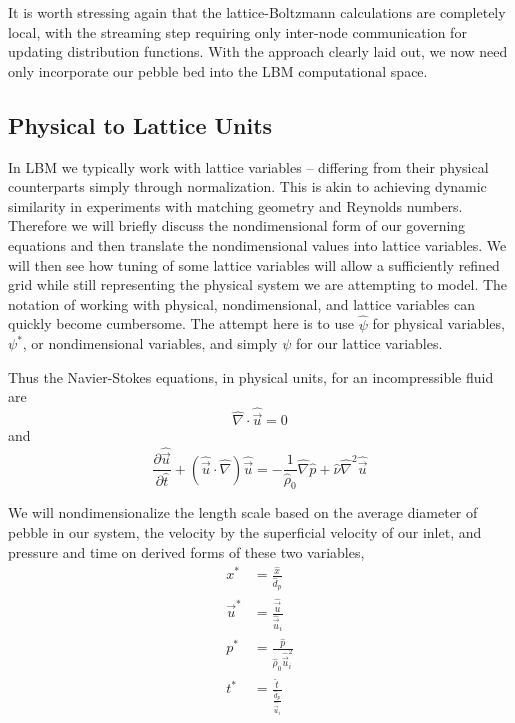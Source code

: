 It is worth stressing again that the lattice-Boltzmann calculations are completely local, with the streaming step requiring only inter-node communication for updating distribution functions. With the approach clearly laid out, we now need only incorporate our pebble bed into the LBM computational space.





\subsection{Physical to Lattice Units}\label{sec:physical-to-lattice}
In LBM we typically work with lattice variables -- differing from their physical counterparts simply through normalization. This is akin to achieving dynamic similarity in experiments with matching geometry and Reynolds numbers. Therefore we will briefly discuss the nondimensional form of our governing equations and then translate the nondimensional values into lattice variables. We will then see how tuning of some lattice variables will allow a sufficiently refined grid while still representing the physical system we are attempting to model. The notation of working with physical, nondimensional, and lattice variables can quickly become cumbersome. The attempt here is to use $\hat{\psi}$ for physical variables, $\psi^*$, or nondimensional variables, and simply $\psi$ for our lattice variables.

Thus the Navier-Stokes equations, in physical units, for an incompressible fluid are
\begin{equation}
	\hat{\nabla}\cdot\hat{\vec{u}} = 0
\end{equation}
and
\begin{equation}
	\frac{\partial \hat{\vec{u}}}{\partial \hat{t}} + (\hat{\vec{u}}\cdot\hat{\nabla})\hat{\vec{u}} = -\frac{1}{\hat{\rho}_0}\hat{\nabla}\hat{p} + \hat{\nu}\hat{\nabla}^2\hat{\vec{u}}
\end{equation}

We will nondimensionalize the length scale based on the average diameter of pebble in our system, the velocity by the superficial velocity of our inlet, and pressure and time on derived forms of these two variables,
\begin{subequations}
\begin{align}
	x^* &= \frac{\hat{x}}{\hat{d}_p} \\
	\vec{u}^* &= \frac{\hat{\vec{u}}}{\hat{\vec{u}}_i} \\
	p^* &= \frac{\hat{p}}{\hat{\rho}_0\hat{\vec{u}}_i^2}\\
	t^* &= \frac{\hat{t}}{\frac{\hat{d}_p}{\hat{\vec{u}}_i}}
\end{align}
\end{subequations}

